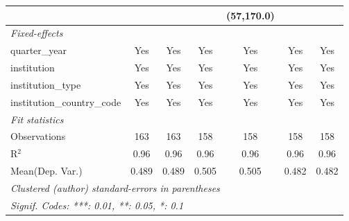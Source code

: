 \begin{tabular}{lcccccc}
                                      &                &             &        & (57,170.0)  &                &   \\   
   \midrule
   \emph{Fixed-effects}\\
   quarter\_year                      & Yes            & Yes         & Yes    & Yes         & Yes            & Yes\\  
   institution                        & Yes            & Yes         & Yes    & Yes         & Yes            & Yes\\  
   institution\_type                  & Yes            & Yes         & Yes    & Yes         & Yes            & Yes\\  
   institution\_country\_code         & Yes            & Yes         & Yes    & Yes         & Yes            & Yes\\  
   \midrule
   \emph{Fit statistics}\\
   Observations                       & 163            & 163         & 158    & 158         & 158            & 158\\  
   R$^2$                              & 0.96           & 0.96        & 0.96   & 0.96        & 0.96           & 0.96\\  
Mean(Dep. Var.) & 0.489 & 0.489 & 0.505 & 0.505 & 0.482 & 0.482 \\
   \midrule \midrule
   \multicolumn{7}{l}{\emph{Clustered (author) standard-errors in parentheses}}\\
   \multicolumn{7}{l}{\emph{Signif. Codes: ***: 0.01, **: 0.05, *: 0.1}}\\
\end{tabular}
\par\endgroup
